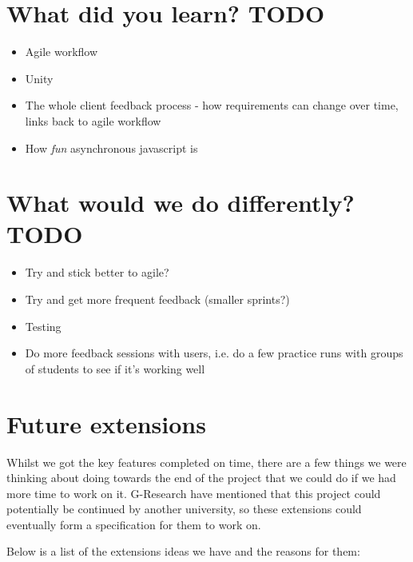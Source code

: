\section{What did you learn? TODO}
\begin{itemize}
    \item
        Agile workflow
    \item
        Unity
    \item
        The whole client feedback process - how requirements can change over
        time, links back to agile workflow
    \item
        How \textit{fun} asynchronous javascript is
\end{itemize}

\section{What would we do differently? TODO}
\begin{itemize}
    \item
        Try and stick better to agile?
    \item
        Try and get more frequent feedback (smaller sprints?)
    \item
        Testing
    \item
        Do more feedback sessions with users, i.e. do a few practice runs with
        groups of students to see if it's working well
\end{itemize}

\section{Future extensions}

Whilst we got the key features completed on time, there are a few things we were 
thinking about doing towards the end of the project that we could do if we had
more time to work on it. G-Research have mentioned that this project could
potentially be continued by another university, so these extensions could
eventually form a specification for them to work on.

Below is a list of the extensions ideas we have and the reasons for them:


